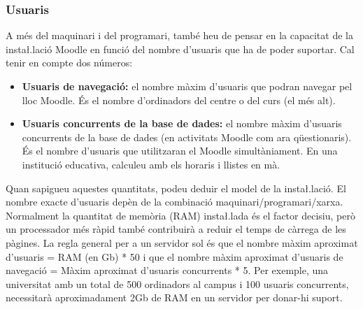 \documentclass[a4paper]{report}  %
\begin{document}
\subsubsection{Usuaris}
A més del maquinari i del programari, també heu de pensar en la capacitat de la insta\l.lació Moodle en funció del nombre d'usuaris que ha de poder suportar. Cal tenir en compte dos números: 
\begin{itemize}
\item \textbf{Usuaris de navegació:} el nombre màxim d'usuaris que podran navegar pel lloc Moodle. És el nombre d'ordinadors del centre o del curs (el més alt). 
\item \textbf{Usuaris concurrents de la base de dades:} el nombre màxim d'usuaris concurrents de la base de dades (en activitats Moodle com ara qüestionaris). És el nombre d'usuaris que utilitzaran el Moodle simultàniament. En una institució educativa, calculeu amb els horaris i llistes en mà. 
\end{itemize}
Quan sapigueu aquestes quantitats, podeu deduir el model de la insta\l.lació. El nombre exacte d'usuaris depèn de la combinació maquinari/programari/xarxa. Normalment la quantitat de memòria (RAM) insta\l.lada és el factor decisiu, però un processador més ràpid també contribuirà a reduir el temps de càrrega de les pàgines. 
La regla general per a un servidor sol és que el nombre màxim aproximat d'usuaris = RAM (en Gb) * 50 i que el nombre màxim aproximat d'usuaris de navegació = Màxim aproximat d'usuaris concurrents * 5. Per exemple, una universitat amb un total de 500 ordinadors al campus i 100 usuaris concurrents, necessitarà aproximadament 2Gb de RAM en un servidor per donar-hi suport. 
\end{document}
